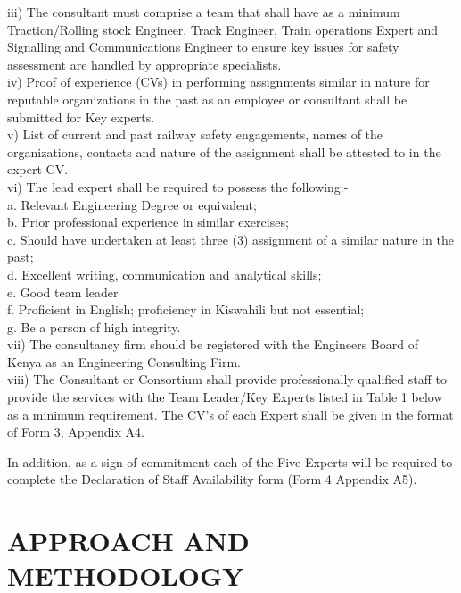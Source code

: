  iii) The consultant must comprise a team  that shall have as a minimum Traction/Rolling stock Engineer, Track  Engineer, Train operations Expert and Signalling and Communications  Engineer to ensure key issues for safety assessment are handled by  appropriate specialists. \\
 iv) Proof of experience (CVs) in performing  assignments similar in nature for reputable organizations in the past as  an employee or consultant shall be submitted for Key experts.\\
 v) List  of current and past railway safety engagements, names of the  organizations, contacts and nature of the assignment shall be attested  to in the expert CV.\\
 vi) The lead expert shall be required to possess the following:-\\
 a. Relevant Engineering Degree or equivalent;\\
 b. Prior  professional experience in similar exercises;\\c. Should have undertaken
 at least three (3) assignment of a similar nature in the past;\\
 d. Excellent writing, communication and analytical skills;\\
 e. Good team leader\\
 f. Proficient in English; proficiency in Kiswahili but not essential;\\
 g. Be a person of high integrity.\\
 vii) The consultancy firm  should be registered with the Engineers Board of Kenya as an Engineering  Consulting Firm.\\
 viii) The Consultant or Consortium shall provide  professionally qualified staff to provide the services with the Team
 Leader/Key Experts listed in Table 1 below as a minimum requirement. The  CV's of each Expert shall be given in the format of Form 3, Appendix A4.
 
 In addition, as a sign of commitment each of the Five Experts will be
 required to complete the Declaration of Staff Availability form (Form 4
 Appendix A5).
 
 
 
 
 
 
 
 
 
 
 
 
 
 
 

\section{APPROACH AND METHODOLOGY}

